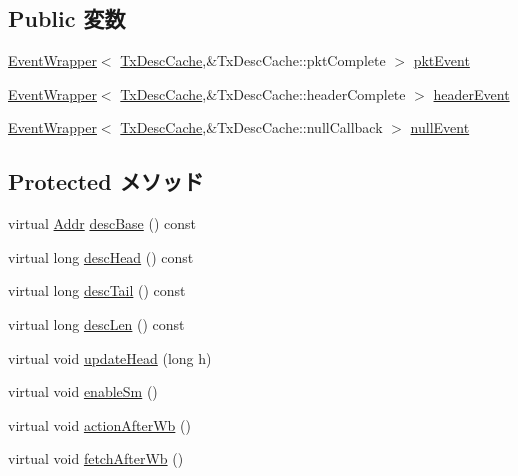 \subsection*{Public 変数}
\begin{DoxyCompactItemize}
\item 
\hyperlink{classEventWrapper}{EventWrapper}$<$ \hyperlink{classIGbE_1_1TxDescCache}{TxDescCache},\&TxDescCache::pktComplete $>$ \hyperlink{classIGbE_1_1TxDescCache_a2a06f4aa962fc09e9e764d3e9006d11b}{pktEvent}
\item 
\hyperlink{classEventWrapper}{EventWrapper}$<$ \hyperlink{classIGbE_1_1TxDescCache}{TxDescCache},\&TxDescCache::headerComplete $>$ \hyperlink{classIGbE_1_1TxDescCache_ae7a8388f5aa169f8c86c19f91c3b128d}{headerEvent}
\item 
\hyperlink{classEventWrapper}{EventWrapper}$<$ \hyperlink{classIGbE_1_1TxDescCache}{TxDescCache},\&TxDescCache::nullCallback $>$ \hyperlink{classIGbE_1_1TxDescCache_adc0e7fe81737dc40daddf8391bffae79}{nullEvent}
\end{DoxyCompactItemize}
\subsection*{Protected メソッド}
\begin{DoxyCompactItemize}
\item 
virtual \hyperlink{base_2types_8hh_af1bb03d6a4ee096394a6749f0a169232}{Addr} \hyperlink{classIGbE_1_1TxDescCache_ae5a77c90557026fdf4fd78883f92bef9}{descBase} () const 
\item 
virtual long \hyperlink{classIGbE_1_1TxDescCache_af3d1877b6f30bdf98b95351c38d400f3}{descHead} () const 
\item 
virtual long \hyperlink{classIGbE_1_1TxDescCache_a4b6b769be62592fc43518ba480bbd1f7}{descTail} () const 
\item 
virtual long \hyperlink{classIGbE_1_1TxDescCache_a465e4e31be3a89db3d7f9cd1ecc40064}{descLen} () const 
\item 
virtual void \hyperlink{classIGbE_1_1TxDescCache_a4f8dbb4f64167626cac110753708c55c}{updateHead} (long h)
\item 
virtual void \hyperlink{classIGbE_1_1TxDescCache_aec7fdcc540223076999e0f8f07f854bc}{enableSm} ()
\item 
virtual void \hyperlink{classIGbE_1_1TxDescCache_a32bbafeff677d291df2eb9247a33b292}{actionAfterWb} ()
\item 
virtual void \hyperlink{classIGbE_1_1TxDescCache_abb8070fbcfa38a9697d92bbc4a0b6505}{fetchAfterWb} ()
\end{DoxyCompactItemize}
